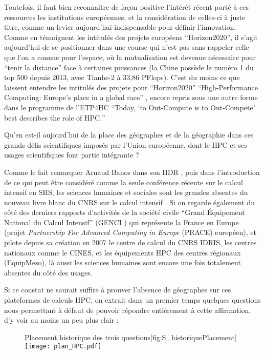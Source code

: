 Toutefois, il faut bien reconnaitre de façon positive l'intérêt récent porté à ces ressources les institutions européennes, et la considération de celles-ci à juste titre, comme un levier aujourd'hui indispensable pour définir l'innovation. Comme en témoignent les intitulés des projets européens \enquote{Horizon2020}, il s'agit aujourd'hui de se positionner dans une course qui n'est pas sans rappeler celle que l'on a connue pour l'espace, où la mutualisation est devenue nécessaire pour \enquote{tenir la distance} face à certaines puissances (la Chine possède le numéro 1 du top 500 depuis 2013, avec Tianhe-2 à 33,86 PFlops). C'est du moins ce que laissent entendre les intitulés des projets pour \enquote{Horizon2020} \foreignquote{english}{High-Performance Computing: Europe's place in a global race} \autocite{HPCHorizon2020}, encore repris sous une autre forme dans le programme de l'ETP4HC \autocites{ETP4HPC2012, ETP4HPC2013} \foreignquote{english}{Today, \enquote{to Out-Compute is to Out-Compete} best describes the role of HPC.}

Qu'en est-il aujourd'hui de la place des géographes et de la géographie dans ces grands défis scientifiques imposés par l'Union européenne, dont le HPC et ses usages scientifiques font partie intégrante ?

Comme le fait remarquer Arnaud Banos dans son HDR \autocite[63]{Banos2013}, puis dans l'introduction de ce qui peut être considéré comme la seule conférence récente sur le calcul intensif en SHS, les sciences humaines et sociales sont les grandes absentes du nouveau livre blanc du CNRS sur le calcul intensif \autocite{COCIN2012}. Si on regarde également du côté des derniers rapports d'activités de la société civile \enquote{Grand Équipement National du Calcul Intensif} (GENCI ) \autocite{GENCI2014} qui représente la France en Europe (projet \textit{Partnership For Advanced Computing in Europe} (PRACE) européen), et pilote depuis sa création en 2007 le centre de calcul du CNRS IDRIS, les centres nationaux comme le CINES, et les équipements HPC des centres régionaux (EquipMeso), là aussi les sciences humaines sont encore une fois totalement absentes du côté des usages.

Si ce constat ne saurait suffire à prouver l'absence de géographes sur ces plateformes de calculs HPC, on extrait dans un premier temps quelques questions nous permettant à défaut de pouvoir répondre entièrement à cette affirmation, d'y voir au moins un peu plus clair :

\begin{figure}[!h]
\begin{sidecaption}{Placement historique des trois questions}[fig:S_historiquePlacement]
  \centering
 \texttt{[image: plan\_HPC.pdf]}
  \end{sidecaption}
\end{figure}

